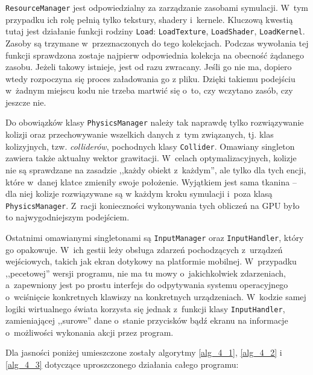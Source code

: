 	\texttt{ResourceManager} jest odpowiedzialny za zarządzanie zasobami symulacji. W~tym przypadku ich rolę pełnią tylko tekstury, shadery i~kernele. Kluczową kwestią tutaj jest działanie funkcji rodziny \texttt{Load}: \texttt{LoadTexture}, \texttt{LoadShader}, \texttt{LoadKernel}. Zasoby są trzymane w~przeznaczonych do tego kolekcjach. Podczas wywołania tej funkcji sprawdzona zostaje najpierw odpowiednia kolekcja na obecność żądanego zasobu. Jeżeli takowy istnieje, jest od razu zwracany. Jeśli go nie ma, dopiero wtedy rozpoczyna się proces załadowania go z pliku. Dzięki takiemu podejściu w~żadnym miejscu kodu nie trzeba martwić się o~to, czy wczytano zasób, czy jeszcze nie.
	
	Do obowiązków klasy \texttt{PhysicsManager} należy tak naprawdę tylko rozwiązywanie kolizji oraz przechowywanie wszelkich danych z~tym związanych, tj. klas kolizyjnych, tzw. \emph{colliderów}, pochodnych klasy \texttt{Collider}. Omawiany singleton zawiera także aktualny wektor grawitacji. W~celach optymalizacyjnych, kolizje nie są sprawdzane na zasadzie ,,każdy obiekt z~każdym'', ale tylko dla tych encji, które w~danej klatce zmieniły swoje położenie. Wyjątkiem jest sama tkanina -- dla niej kolizje rozwiązywane są w każdym kroku symulacji i~poza klasą \texttt{PhysicsManager}. Z~racji konieczności wykonywania tych obliczeń na GPU było to najwygodniejszym podejściem.
	
	Ostatnimi omawianymi singletonami są \texttt{InputManager} oraz \texttt{InputHandler}, który go opakowuje. W~ich gestii leży obsługa zdarzeń pochodzących z~urządzeń wejściowych, takich jak ekran dotykowy na platformie mobilnej. W~przypadku ,,pecetowej'' wersji programu, nie ma tu mowy o~jakichkolwiek zdarzeniach, a~zapewniony jest po prostu interfejs do odpytywania systemu operacyjnego o~wciśnięcie konkretnych klawiszy na konkretnych urządzeniach. W~kodzie samej logiki wirtualnego świata korzysta się jednak z~funkcji klasy \texttt{InputHandler}, zamieniającej ,,surowe'' dane o~stanie przycisków bądź ekranu na informacje o~możliwości wykonania akcji przez program.
	
	Dla jasności poniżej umieszczone zostały algorytmy \ref{alg_4_1}, \ref{alg_4_2} i \ref{alg_4_3} dotyczące uproszczonego działania całego programu:
	
